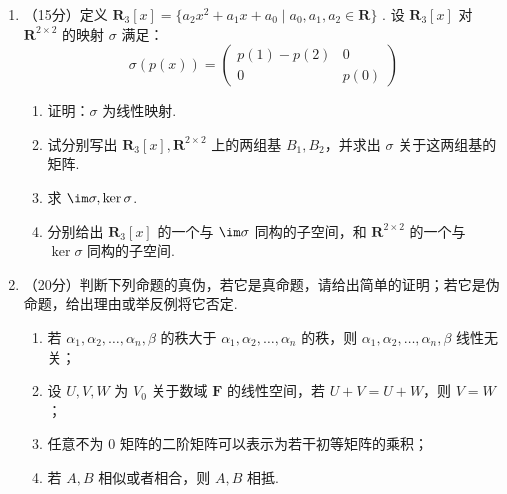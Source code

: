 \begin{enumerate}
	\item （15分）定义 $\mathbf R_3[x]=\{a_2x^2+a_1x+a_0\mid a_0,a_1,a_2\in \mathbf R\}$ . 设 $\mathbf R_3[x]$ 对 $\mathbf R^{2\times 2}$ 的映射 $\sigma$ 满足：
	\[\sigma(p(x))=\begin{pmatrix}
	    p(1)-p(2)&0\\
	    0 & p(0)\end{pmatrix}\]

        \begin{enumerate}
            \item 证明：$\sigma$ 为线性映射.
            \item 试分别写出 $\mathbf R_3[x],\mathbf R^{2\times 2}$ 上的两组基 $B_1,B_2$，并求出 $\sigma$ 关于这两组基的矩阵.
            \item 求 $\im\sigma,\ker\sigma$.
            \item 分别给出 $\mathbf R_3[x]$ 的一个与 $\im\sigma$ 同构的子空间，和 $\mathbf R^{2\times 2}$ 的一个与 $\ker\sigma$ 同构的子空间.
        \end{enumerate}

	\item （20分）判断下列命题的真伪，若它是真命题，请给出简单的证明；若它是伪命题，给出理由或举反例将它否定.
    \begin{enumerate}
        \item 若 $\alpha_1,\alpha_2,\dots,\alpha_n,\beta$ 的秩大于 $\alpha_1,\alpha_2,\dots,\alpha_n$ 的秩，则 $\alpha_1,\alpha_2,\dots,\alpha_n,\beta$ 线性无关；
        \item 设 $U,V,W$ 为 $V_0$ 关于数域 $\mathbf{F}$ 的线性空间，若 $U+V=U+W$，则 $V=W$；
        \item 任意不为 0 矩阵的二阶矩阵可以表示为若干初等矩阵的乘积；
        \item 若 $A,B$ 相似或者相合，则 $A,B$ 相抵.
    \end{enumerate}
\end{enumerate}

\clearpage
